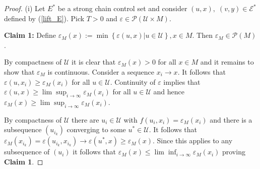 \documentclass[preprint,12pt]{elsarticle}
\begin{document}
\begin{proof}
(i) Let $E^{\ast}$ be a strong chain control set and consider
$(u,x),\;(v,y)\in\mathcal{E}^{\ast}$ defined by (\ref{lift_E}). Pick $T>0$ and
$\varepsilon\in\mathcal{P}(\mathcal{U}\times M)$.

\textbf{Claim 1:} Define $\varepsilon_{M}(x):=\min\left\{  \varepsilon
(u,x)\left\vert u\in\mathcal{U}\right.  \right\}  ,x\in M.$ Then
$\varepsilon_{M}\in\mathcal{P}(M)$.

By compactness of $\mathcal{U}$ it is clear that $\varepsilon_{M}(x)>0$ for
all $x\in M$ and it remains to show that $\varepsilon_{M}$ is continuous.
Consider a sequence $x_{i}\rightarrow x$. It follows that $\varepsilon
(u,x_{i})\geq\varepsilon_{M}(x_{i})$ for all $u\in\mathcal{U}$. Continuity of
$\varepsilon$ implies that $\varepsilon(u,x)\geq\lim\sup_{i\rightarrow\infty
}\varepsilon_{M}(x_{i})$ for all $u\in\mathcal{U}$ and hence $\varepsilon
_{M}(x)\geq\lim\sup_{i\rightarrow\infty}\varepsilon_{M}(x_{i})$.

By compactness of $\mathcal{U}$ there are $u_{i}\in\mathcal{U}$ with
$f(u_{i},x_{i})=\varepsilon_{M}(x_{i})$ and there is a subsequence $(u_{i_{k}%
})$ converging to some $u^{\ast}\in\mathcal{U}$. It follows that
$\varepsilon_{M}(x_{i_{k}})=\varepsilon(u_{i_{k}},x_{i_{k}})\rightarrow
\varepsilon(u^{\ast},x)\geq\varepsilon_{M}(x)$. Since this applies to any
subsequence of $(u_{i})$ it follows that $\varepsilon_{M}(x)\leq\lim
\inf_{i\rightarrow\infty}\varepsilon_{M}(x_{i})$ proving \textbf{Claim 1}.


\end{proof}
\end{document}
